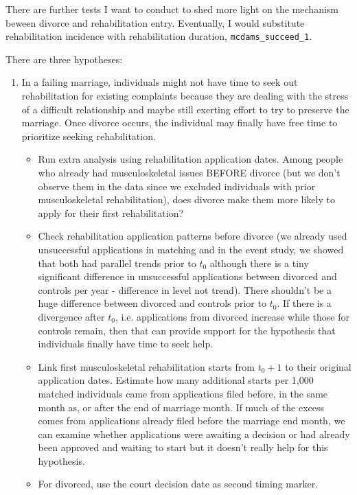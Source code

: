 \documentclass[a4paper,12pt]{article}
\theoremstyle{plain}
\theoremstyle{definition}
\theoremstyle{TheoremNum}
\theoremstyle{CorollaryNum}
\theoremstyle{PropositionNum}
\theoremstyle{TheoremNum}
\begin{document}
{\color{blue}
There are further tests I want to conduct to shed more light on the mechanism beween divorce and rehabilitation entry. Eventually, I would substitute rehabilitation incidence with rehabilitation duration, \texttt{mcdams\_succeed\_1}.

There are three hypotheses:
\begin{enumerate}
    \item In a failing marriage, individuals might not have time to seek out rehabilitation for existing complaints because they are dealing with the stress of a difficult relationship and maybe still exerting effort to try to preserve the marriage. Once divorce occurs, the individual may finally have free time to prioritize seeking rehabilitation. 
    \begin{itemize}
        \item Run extra analysis using rehabilitation application dates. Among people who already had musculoskeletal issues BEFORE divorce (but we don't observe them in the data since we excluded individuals with prior musculoskeletal rehabilitation), does divorce make them more likely to apply for their first rehabilitation?
        \item Check rehabilitation application patterns before divorce (we already used unsuccessful applications in matching and in the event study, we showed that both had parallel trends prior to $t_0$ although there is a tiny significant difference in unsuccessful applications between divorced and controls per year - difference in level not trend). There shouldn't be a huge difference between divorced and controls prior to $t_0$. If there is a divergence after $t_0$, i.e. applications from divorced increase while those for controls remain, then that can provide support for the hypothesis that individuals finally have time to seek help.
        \item Link first musculoskeletal rehabilitation starts from $t_0+1$ to their original application dates. Estimate how many additional starts per 1,000 matched individuals came from applications filed before, in the same month as, or after the end of marriage month. If much of the excess comes from applications already filed before the marriage end month, we can examine whether applications were awaiting a decision or had already been approved and waiting to start but it doesn't really help for this hypothesis.
        \item For divorced, use the court decision date as second timing marker. 
    \end{itemize}

\end{enumerate}}
\end{document}
